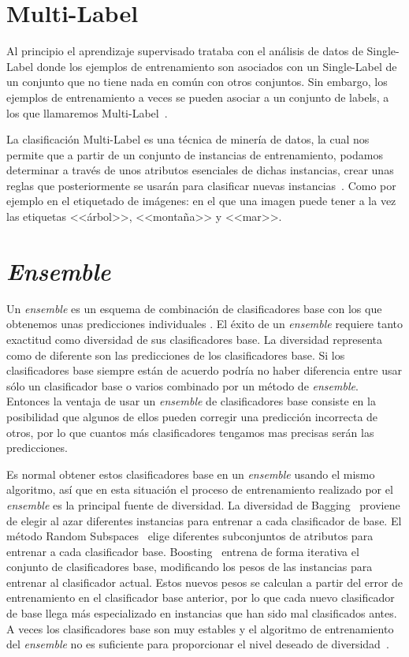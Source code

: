 \section{Multi-Label}
Al principio el aprendizaje supervisado trataba con el análisis de datos de Single-Label donde los ejemplos de entrenamiento son asociados con un Single-Label de un conjunto que no tiene nada en común con otros conjuntos. Sin embargo, los ejemplos de entrenamiento a veces se pueden asociar a un conjunto de labels, a los que llamaremos Multi-Label~\cite{multilabel2}.

La clasificación Multi-Label es una técnica de minería de datos, la cual nos permite que a partir de un conjunto de instancias de entrenamiento, podamos determinar a través de unos atributos esenciales de dichas instancias, crear unas reglas que posteriormente se usarán para clasificar nuevas instancias~\cite{multilabel}. Como por ejemplo en el etiquetado de imágenes: en el que una imagen puede tener a la vez las etiquetas <<árbol>>, <<montaña>> y <<mar>>.   

\section{\textit{Ensemble}}
Un \textit{ensemble} es un esquema de combinación de clasificadores base con los que obtenemos unas predicciones individuales . El éxito de un \textit{ensemble} requiere tanto exactitud como diversidad de sus clasificadores base. La diversidad representa como de diferente son las predicciones de los clasificadores base. Si los clasificadores base siempre están de acuerdo podría no haber diferencia entre usar sólo un clasificador base o varios combinado por un método de \textit{ensemble}. Entonces la ventaja de usar un \textit{ensemble} de clasificadores base consiste en la posibilidad que algunos de ellos pueden corregir una predicción incorrecta de otros, por lo que cuantos más clasificadores tengamos mas precisas serán las predicciones. 

Es normal obtener estos clasificadores base en un \textit{ensemble} usando el mismo algoritmo, así que en esta situación el proceso de entrenamiento realizado por el \textit{ensemble} es la principal fuente de diversidad. La diversidad de Bagging~\cite{bagging} proviene de elegir al azar diferentes instancias para entrenar a cada clasificador de base. El método Random Subspaces~\cite{randomsubspace} elige diferentes subconjuntos de atributos para entrenar a cada clasificador base. Boosting~\cite{boosting} entrena de forma iterativa el conjunto de clasificadores base, modificando los pesos de las instancias para entrenar al clasificador actual. Estos nuevos pesos se calculan a partir del error de entrenamiento en el clasificador base anterior, por lo que cada nuevo clasificador de base llega más especializado en instancias que han sido mal clasificados antes. A veces los clasificadores base son muy estables y el  algoritmo de entrenamiento del \textit{ensemble} no es suficiente para proporcionar el nivel deseado de diversidad~\cite{disturbingneighbors}.

